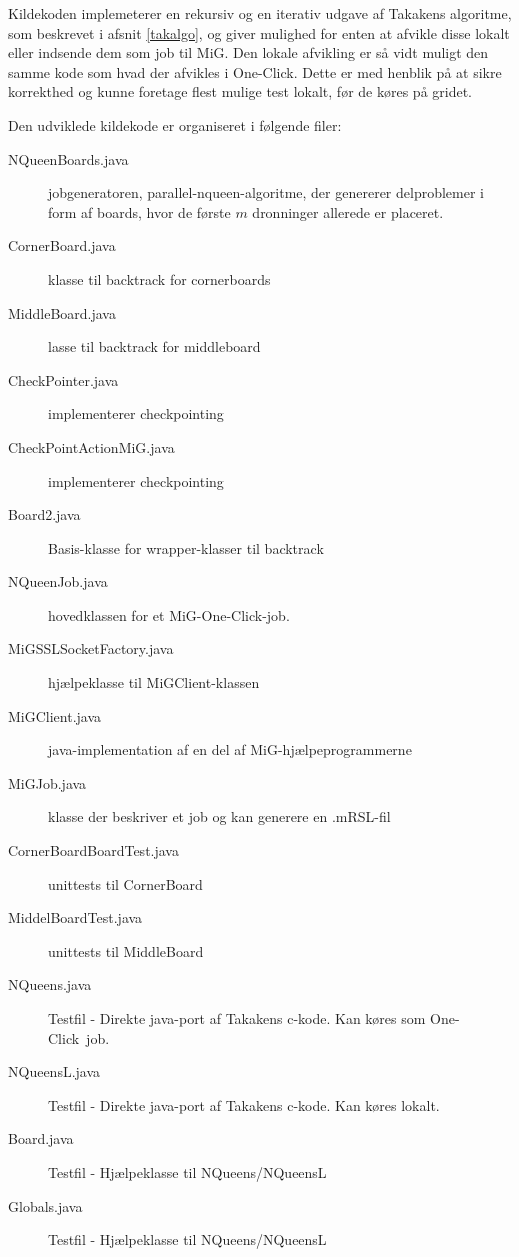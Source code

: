 \documentclass[draft,a4paper,11pt]{article}
\newcommand{\mig}{MiG}
\newcommand{\oc}{One-Click}
\begin{document}
Kildekoden implemeterer en rekursiv og en iterativ udgave af Takakens algoritme, som beskrevet i afsnit \ref{takalgo}, og giver mulighed for enten at afvikle disse lokalt eller indsende dem som job til \mig. Den lokale afvikling er så vidt muligt den samme kode som hvad der afvikles i \oc. Dette er med henblik på at sikre korrekthed og kunne foretage flest mulige test lokalt, før de køres på gridet. 







Den udviklede kildekode er organiseret i følgende filer:

\begin{description}
	\item[NQueenBoards.java] jobgeneratoren, parallel-nqueen-algoritme, der genererer delproblemer i form af boards, hvor de første $m$ dronninger allerede er placeret. 
	\item[CornerBoard.java] klasse til backtrack for cornerboards
	\item[MiddleBoard.java] lasse til backtrack for middleboard
	\item[CheckPointer.java] implementerer checkpointing
	\item[CheckPointActionMiG.java] implementerer checkpointing
	\item[Board2.java] Basis-klasse for wrapper-klasser til backtrack
	\item[NQueenJob.java] hovedklassen for et \mig-\oc-job. 
	\item[MiGSSLSocketFactory.java] hjælpeklasse til MiGClient-klassen
	\item[MiGClient.java] java-implementation af en del af \mig-hjælpeprogrammerne
	\item[MiGJob.java] klasse der beskriver et job og kan generere en .mRSL-fil
	\item[CornerBoardBoardTest.java] unittests til CornerBoard
	\item[MiddelBoardTest.java] unittests til MiddleBoard
	\item[NQueens.java] Testfil - Direkte java-port af Takakens c-kode. Kan køres som \oc\ job.
	\item[NQueensL.java] Testfil - Direkte java-port af Takakens c-kode. Kan køres lokalt.
	\item[Board.java] Testfil - Hjælpeklasse til NQueens/NQueensL
	\item[Globals.java] Testfil - Hjælpeklasse til NQueens/NQueensL
\end{description}
\end{document}
